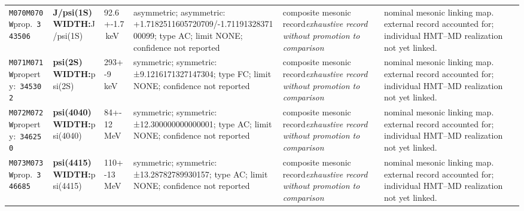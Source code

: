 \begin{landscape}
\begin{longtable}{L{1.85cm}L{4.45cm}L{2.35cm}L{4.05cm}L{3.35cm}L{7.15cm}}
\texttt{M070}\newline \texttt{M070W}\newline prop.\ \texttt{343506} & \textbf{J/psi(1S) WIDTH:}\newline J/psi(1S) & 92.6+-1.7\,keV & asymmetric; asymmetric: +1.7182511605720709/-1.7119132837100099; type AC; limit NONE; confidence not reported & composite mesonic record\newline \emph{exhaustive record without promotion to comparison} & nominal mesonic linking map. external record accounted for; individual HMT--MD realization not yet linked. \\
\texttt{M071}\newline \texttt{M071W}\newline property:\ \texttt{345302} & \textbf{psi(2S) WIDTH:}\newline psi(2S) & 293+-9\,keV & symmetric; symmetric: ±9.1216171327147304; type FC; limit NONE; confidence not reported & composite mesonic record\newline \emph{exhaustive record without promotion to comparison} & nominal mesonic linking map. external record accounted for; individual HMT--MD realization not yet linked. \\
\texttt{M072}\newline \texttt{M072W}\newline property:\ \texttt{346250} & \textbf{psi(4040) WIDTH:}\newline psi(4040) & 84+-12\,MeV & symmetric; symmetric: ±12.300000000000001; type AC; limit NONE; confidence not reported & composite mesonic record\newline \emph{exhaustive record without promotion to comparison} & nominal mesonic linking map. external record accounted for; individual HMT--MD realization not yet linked. \\
\texttt{M073}\newline \texttt{M073W}\newline prop.\ \texttt{346685} & \textbf{psi(4415) WIDTH:}\newline psi(4415) & 110+-13\,MeV & symmetric; symmetric: ±13.28782789930157; type AC; limit NONE; confidence not reported & composite mesonic record\newline \emph{exhaustive record without promotion to comparison} & nominal mesonic linking map. external record accounted for; individual HMT--MD realization not yet linked. \\

\end{longtable}
\end{landscape}
